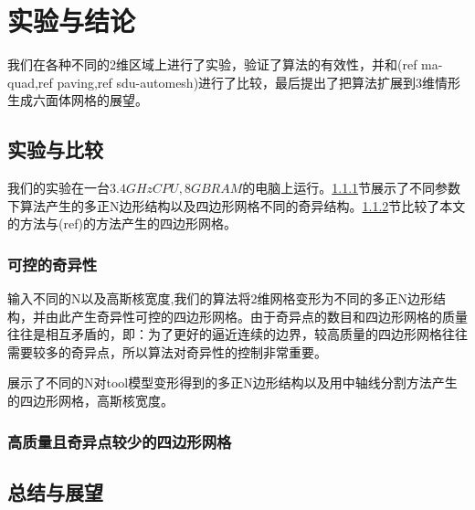 \chapter{实验与结论} \label{chap:exandcon}
我们在各种不同的2维区域上进行了实验，验证了算法的有效性，并和(ref ma-quad,ref  paving,ref sdu-automesh)进行了比较，最后提出了把算法扩展到3维情形生成六面体网格的展望。
\section{实验与比较}
我们的实验在一台$3.4GHz CPU, 8GB RAM$的电脑上运行。\ref{sec:control-singular}节展示了不同参数下算法产生的多正N边形结构以及四边形网格不同的奇异结构。\ref{sec:comparison}节比较了本文的方法与(ref)的方法产生的四边形网格。
\subsection{可控的奇异性} \label{sec:control-singular}
输入不同的N以及高斯核宽度\mksize,我们的算法将2维网格变形为不同的多正N边形结构，并由此产生奇异性可控的四边形网格。由于奇异点的数目和四边形网格的质量往往是相互矛盾的，即：为了更好的逼近连续的边界，较高质量的四边形网格往往需要较多的奇异点，所以算法对奇异性的控制非常重要。

展示了不同的N对tool模型变形得到的多正N边形结构以及用中轴线分割方法产生的四边形网格，高斯核宽度。
\subsection{高质量且奇异点较少的四边形网格}\label{sec:comparison}
\section{总结与展望}